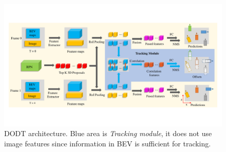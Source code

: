 \documentclass[letterpaper, 10 pt, conference]{ieeeconf}  %
\begin{document}


\begin{figure}
	\vspace{-0.6cm}
	\rule{0pt}{1ex}
	\begin{center}
		\includegraphics[trim={0.5cm, 3cm, 0.5cm, 3cm}, clip, width=\textwidth]{images/structure.pdf}
	\end{center}
	\caption{DODT architecture. Blue area is \textit{Tracking module}, it does not use image features since information in BEV is sufficient for tracking.}
	\label{fig:dodt}
	\vspace{-0.4cm}
\end{figure}
\end{document}
